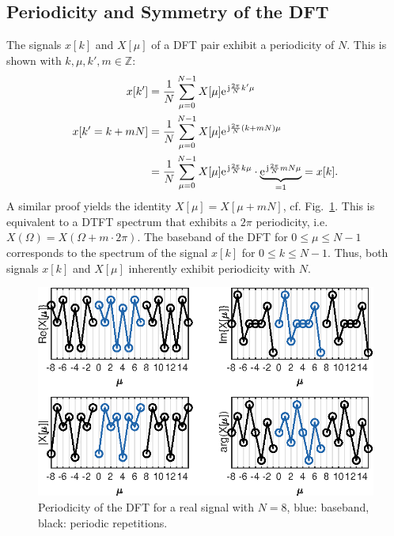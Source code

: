 \documentclass[11pt,a4paper,DIV=12]{scrartcl}
\begin{document}
\subsection{Periodicity and Symmetry of the DFT}
The signals $x[k]$ and $X[\mu]$ of a DFT pair exhibit a periodicity of $N$.
%
This is shown with $k,\mu,k',m\in\mathbb{Z}$:
\begin{align}
x[k']&=\frac{1}{N}\sum_{\mu=0}^{N-1}X[\mu]\e^{\im\frac{2\pi}{N}k'\mu}\\
x[k'=k+m N]&=\frac{1}{N}\sum_{\mu=0}^{N-1}X[\mu]\e^{\im\frac{2\pi}{N}(k+mN)\mu}\\
&=\frac{1}{N}\sum_{\mu=0}^{N-1}X[\mu]\e^{\im\frac{2\pi}{N}k\mu}\cdot\underbrace{\e^{\im\frac{2\pi}{N}mN\mu}}_{=1}=x[k].
\end{align}
%
A similar proof yields the identity $X[\mu]=X[\mu+mN]$, cf.
Fig.~\ref{Periodicity_DFT}.
%
This is equivalent to a DTFT spectrum that exhibits a $2\pi$ periodicity, i.e.
$X(\Omega)=X(\Omega+m\cdot2\pi)$.
%
The baseband of the DFT for $0\leq\mu\leq N-1$ corresponds to the spectrum of
the signal $x[k]$ for $0\leq k\leq N-1$.
%
Thus, both signals $x[k]$ and $X[\mu]$ inherently exhibit periodicity with $N$.
\begin{figure}
		\centering
		\includegraphics[width=12cm]{graphics/Periodicity_DFT}
		\caption{Periodicity of the DFT for a real signal with $N=8$,
		blue: baseband, black: periodic repetitions.}
		\label{Periodicity_DFT}
\end{figure}%
\end{document}
